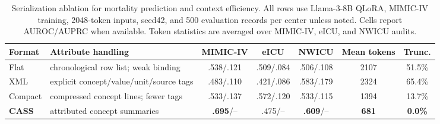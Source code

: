 \begin{table}[t]
\caption{Serialization ablation for mortality prediction and context efficiency. All rows use Llama-3-8B QLoRA, MIMIC-IV training, 2048-token inputs, seed42, and 500 evaluation records per center unless noted. Cells report AUROC/AUPRC when available. Token statistics are averaged over MIMIC-IV, eICU, and NWICU audits.}
\label{tab:serialization_ablation}
\centering
\scriptsize
\setlength{\tabcolsep}{3.0pt}
\begin{tabular}{llccccc}
\toprule
Format & Attribute handling & MIMIC-IV & eICU & NWICU & Mean tokens & Trunc. \\
\midrule
Flat & chronological row list; weak binding & .538/.121 & .509/.084 & .506/.108 & 2107 & 51.5\% \\
XML & explicit concept/value/unit/source tags & .483/.110 & .421/.086 & .583/.179 & 2324 & 65.4\% \\
Compact & compressed concept lines; fewer tags & .533/.137 & .572/.120 & .533/.115 & 1394 & 13.7\% \\
\textbf{CASS} & attributed concept summaries & \textbf{.695}/-- & .475/-- & \textbf{.609}/-- & \textbf{681} & \textbf{0.0\%} \\
\bottomrule
\end{tabular}
\end{table}
